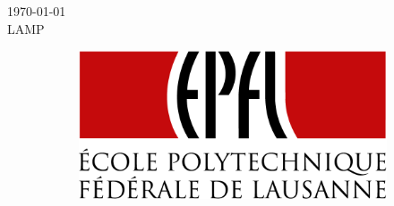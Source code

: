 \begin{titlepage}


{\large \today}\\[0.5cm]
{\large LAMP}\\[1cm]


\begin{figure}[b]
    \centering
    \begin{subfigure}[b]{0.30\textwidth}
      \flushleft
        
      \includegraphics[width=\textwidth]{imgs/epfl_logo.png}\\[1cm]
    \end{subfigure}
\end{figure}
 

\vfill %

\end{titlepage}